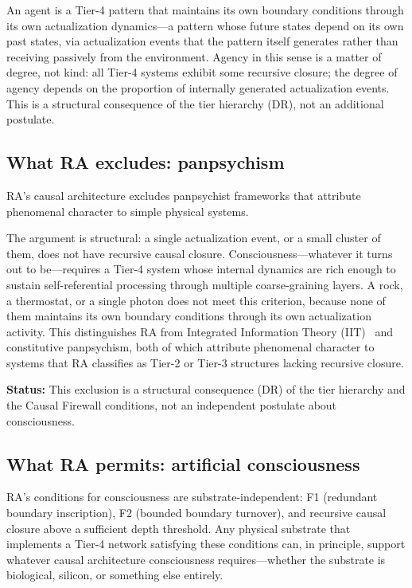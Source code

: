 \documentclass[11pt]{article}
\begin{document}
An agent is a Tier-4 pattern that maintains its own boundary conditions through its own actualization dynamics---a pattern whose future states depend on its own past states, via actualization events that the pattern itself generates rather than receiving passively from the environment. Agency in this sense is a matter of degree, not kind: all Tier-4 systems exhibit some recursive closure; the degree of agency depends on the proportion of internally generated actualization events. This is a structural consequence of the tier hierarchy (DR), not an additional postulate.

\subsection{What RA excludes: panpsychism}

RA's causal architecture excludes panpsychist frameworks that attribute phenomenal character to simple physical systems.

The argument is structural: a single actualization event, or a small cluster of them, does not have recursive causal closure. Consciousness---whatever it turns out to be---requires a Tier-4 system whose internal dynamics are rich enough to sustain self-referential processing through multiple coarse-graining layers. A rock, a thermostat, or a single photon does not meet this criterion, because none of them maintains its own boundary conditions through its own actualization activity. This distinguishes RA from Integrated Information Theory (IIT)~\cite{Tononi2016} and constitutive panpsychism, both of which attribute phenomenal character to systems that RA classifies as Tier-2 or Tier-3 structures lacking recursive closure.

\textbf{Status:} This exclusion is a structural consequence (DR) of the tier hierarchy and the Causal Firewall conditions, not an independent postulate about consciousness.

\subsection{What RA permits: artificial consciousness}

RA's conditions for consciousness are substrate-independent: F1 (redundant boundary inscription), F2 (bounded boundary turnover), and recursive causal closure above a sufficient depth threshold. Any physical substrate that implements a Tier-4 network satisfying these conditions can, in principle, support whatever causal architecture consciousness requires---whether the substrate is biological, silicon, or something else entirely.
\end{document}
